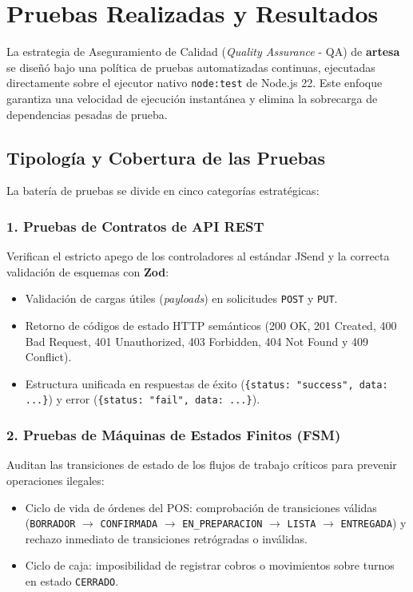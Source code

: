 \section{Pruebas Realizadas y Resultados}
\label{sec:pruebas_resultados}

La estrategia de Aseguramiento de Calidad (\textit{Quality Assurance} - QA) de \textbf{artesa} se diseñó bajo una política de pruebas automatizadas continuas, ejecutadas directamente sobre el ejecutor nativo \texttt{node:test} de Node.js 22. Este enfoque garantiza una velocidad de ejecución instantánea y elimina la sobrecarga de dependencias pesadas de prueba.

\subsection{Tipología y Cobertura de las Pruebas}

La batería de pruebas se divide en cinco categorías estratégicas:

\subsubsection{1. Pruebas de Contratos de API REST}
Verifican el estricto apego de los controladores al estándar JSend y la correcta validación de esquemas con \textbf{Zod}:
\begin{itemize}
    \item Validación de cargas útiles (\textit{payloads}) en solicitudes \texttt{POST} y \texttt{PUT}.
    \item Retorno de códigos de estado HTTP semánticos (200 OK, 201 Created, 400 Bad Request, 401 Unauthorized, 403 Forbidden, 404 Not Found y 409 Conflict).
    \item Estructura unificada en respuestas de éxito (\texttt{\{status: "success", data: ...\}}) y error (\texttt{\{status: "fail", data: ...\}}).
\end{itemize}

\subsubsection{2. Pruebas de Máquinas de Estados Finitos (FSM)}
Auditan las transiciones de estado de los flujos de trabajo críticos para prevenir operaciones ilegales:
\begin{itemize}
    \item Ciclo de vida de órdenes del POS: comprobación de transiciones válidas (\texttt{BORRADOR} $\rightarrow$ \texttt{CONFIRMADA} $\rightarrow$ \texttt{EN\_PREPARACION} $\rightarrow$ \texttt{LISTA} $\rightarrow$ \texttt{ENTREGADA}) y rechazo inmediato de transiciones retrógradas o inválidas.
    \item Ciclo de caja: imposibilidad de registrar cobros o movimientos sobre turnos en estado \texttt{CERRADO}.
\end{itemize}

